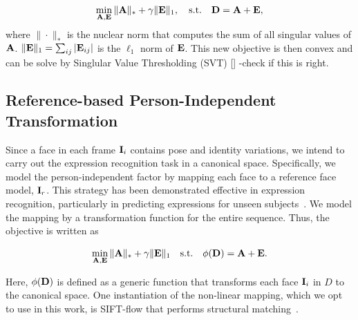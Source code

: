 \documentclass[journal]{IEEEtran}
\begin{document}
\begin{equation} \label{eq:rpca}
\min_{\A,\E} \|\A\|_*+\gamma \|\E\|_1,  \quad \text{s.t.} \quad \D = \A + \E, 
\end{equation}
where $\|\cdot\|_*$ is the nuclear norm that computes the sum of all singular values of ${\bf A}$. $\|{\bf E}\|_1=\sum_{ij}|{\bf E}_{ij}|$ is the $\ell_1$ norm of ${\bf E}$. This new objective is then convex and can be solve by \textcolor[rgb]{1,0,0}{Singlular Value Thresholding (SVT) [] -check if this is right}. 


\subsection{Reference-based Person-Independent Transformation} 

Since a face in each frame ${\bf I}_i$ contains pose and identity variations, we intend to carry out the expression recognition task in a canonical space. Specifically, we model the person-independent factor by mapping each face to a reference face model, ${\bf I}_r$. This strategy has been demonstrated effective in expression recognition, particularly in predicting expressions for unseen subjects~\cite{Yang_SMCB12,Dahmane_TMM14}. We model the mapping by a transformation function for the entire sequence. Thus, the objective is written as

\begin{equation} \label{eq:rpca}
\min_{\A,\E} \|\A\|_*+\gamma \|\E\|_1  \quad \text{s.t.} \quad \phi (\D) = \A + \E. 
\end{equation}

Here, $\phi ({\bf D})$ is defined as a generic function that transforms each face ${\bf I}_i$ in $D$ to the canonical space. One instantiation of the non-linear mapping, which we opt to use in this work, is SIFT-flow that performs structural matching~\cite{Liu_PAMI11}. 
\end{document}
